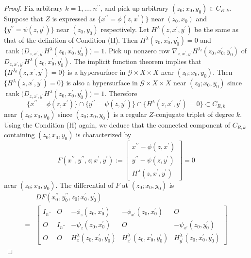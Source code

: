 \documentclass[10pt,a4paper]{amsart}
\begin{document}
\begin{proof}
Fix arbitrary $k=1,\dotsc,n^{\prime\prime}$, 
and pick up arbitrary $(z_0;x_0,y_0) \in C_{R,k}$. 
Suppose that $Z$ is expressed as 
$\{x^{\prime\prime}=\phi(z,x^\prime)\}$ near $(z_0,x_0)$ 
and 
$\{y^{\prime\prime}=\psi(z,y^\prime)\}$ near $(z_0,y_0)$ 
respectively. 
Let $H^\lambda(z,x^\prime,y^\prime)$ be the same as 
that of the definition of Condition (H). 
Then $H^\lambda(z_0,x_0^\prime,y_0^\prime)=0$ and 
$\operatorname{rank}\bigl(D_{z,x^\prime,y^\prime}H^{\lambda}(z_0,x_0^\prime,y_0^\prime)\bigr)=1$. 
Pick up nonzero row 
$\nabla_{z,x^\prime,y^\prime}H^{\lambda_l}(z_0,x_0^\prime,y_0^\prime)$ of 
$D_{z,x^\prime,y^\prime}H^{\lambda}(z_0,x_0^\prime,y_0^\prime)$. 
The implicit function theorem implies that 
$\{H^{\lambda_l}(z,x^\prime,y^\prime)=0\}$ is a hypersurface in 
$\mathcal{G} \times X \times X$ near $(z_0;x_0,y_0)$. 
Then $\{H^{\lambda}(z,x^\prime,y^\prime)=0\}$ is also a hypersurface in 
$\mathcal{G} \times X \times X$ near $(z_0;x_0,y_0)$ 
since $\operatorname{rank}\bigl(D_{z,x^\prime,y^\prime}H^{\lambda}(z_0,x_0^\prime,y_0^\prime)\bigr)=1$. Therefore 
%
%
$$
\{x^{\prime\prime}=\phi(z,x^\prime)\}
\cap
\{y^{\prime\prime}=\psi(z,y^\prime)\}
\cap
\{H^{\lambda}(z,x^\prime,y^\prime)=0\}
\subset 
C_{R,k}
$$
%
% 
near $(z_0;x_0,y_0)$ since 
$(z_0;x_0,y_0)$ is a regular $Z$-conjugate triplet of degree $k$. 
Using the Condition (H) again, we deduce that 
the connected component of $C_{R,k}$ containing $(z_0;x_0,y_0)$ is characterized by 
%
%
$$
F(x^{\prime\prime},y^{\prime\prime},z;x^\prime,y^\prime)
:=
\begin{bmatrix}
x^{\prime\prime}-\phi(z,x^\prime)
\\
y^{\prime\prime}-\psi(z,y^\prime) 
\\
H^\lambda(z,x^\prime,y^\prime)
\end{bmatrix}
=0
$$
%
%
near $(z_0;x_0,y_0)$. 
The differential of $F$ at $(z_0;x_0,y_0)$ is 
%
%
\begin{align*}
& DF(x_0^{\prime\prime},y_0^{\prime\prime},z_0;x_0^\prime,y_0^\prime)
\\
  =
& \begin{bmatrix}
  I_{n^{\prime\prime}} & O & -\phi_z(z_0,x_0^\prime) & -\phi_{x^\prime}(z_0,x_0^\prime) & O
  \\
  O & I_{n^{\prime\prime}} &  -\psi_z(z_0,x_0^\prime) & O & -\psi_{x^\prime}(z_0,y_0^\prime)
  \\
  O & O & H_z^\lambda(z_0,x_0^\prime,y_0^\prime) & H_{x^\prime}^\lambda(z_0,x_0^\prime,y_0^\prime) & H_{y^\prime}^\lambda(z_0,x_0^\prime,y_0^\prime)

\end{bmatrix}
\end{align*}
\end{proof}
\end{document}
